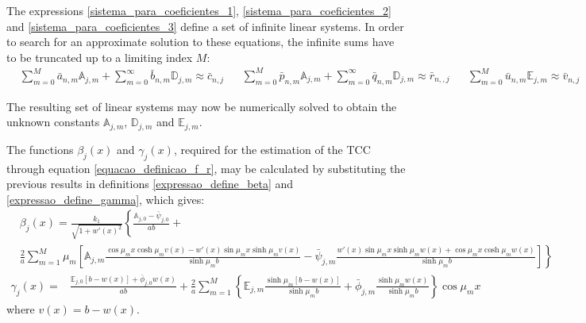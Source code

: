 \documentclass[12pt]{CHT-20}
\begin{document}
The expressions \eqref{sistema_para_coeficientes_1}, \eqref{sistema_para_coeficientes_2} and \eqref{sistema_para_coeficientes_3} define a set of infinite linear systems. In order to search for an approximate solution to these equations, the infinite sums have to be truncated up to a limiting index $M$:
\begin{subequations}
	\begin{align}
	& \sum_{m = 0}^M \bar{a}_{n,m} \mathbb{A}_{j,m} + \sum_{m = 0}^\infty \bar{b}_{n,m} \mathbb{D}_{j,m} \approx \bar{c}_{n,j} \label{sistema_para_coeficientes_1a}
	\end{align}
	\begin{align}
	& \sum_{m = 0}^M \bar{p}_{n,m} \mathbb{A}_{j,m} + \sum_{m = 0}^\infty \bar{q}_{n,m} \mathbb{D}_{j,m} \approx \bar{r}_{n,,j} \label{sistema_para_coeficientes_2a}
	\end{align}
	\begin{align}
	& \sum_{m = 0}^M \bar{u}_{n,m} \mathbb{E}_{j,m} \approx \bar{v}_{n,j} \label{sistema_para_coeficientes_3a}
	\end{align}
\end{subequations}

The resulting set of linear systems may now be numerically solved to obtain the unknown constants $\mathbb{A}_{j,m}$, $\mathbb{D}_{j,m}$ and $\mathbb{E}_{j,m}$.

The functions $\beta_j(x)$ and $\gamma_j(x)$, required for the estimation of the TCC through equation \eqref{equacao_definicao_f_r}, may be calculated by substituting the previous results in definitions \eqref{expressao_define_beta} and \eqref{expressao_define_gamma}, which gives:
\begin{align}
& \beta_j(x) = \frac{k_1}{\sqrt{1 + w'(x)^2}}\left\lbrace \frac{\mathbb{A}_{j,0} - \bar{\psi}_{j,0}}{ab} +
\right. \nonumber \\
& \frac{2}{a}\sum_{m=1}^M \mu_m  \left[ \mathbb{A}_{j,m}\frac{\scriptstyle\cos\mu_m x\cosh\mu_m v(x) - w'(x)\sin\mu_m x\sinh\mu_m v(x)}{\scriptstyle\sinh\mu_m b} \right. - 
\left. \left. \bar{\psi}_{j, m}\frac{\scriptstyle w'(x)\sin\mu_m x\sinh\mu_m w(x) + \cos\mu_m x\cosh\mu_m w(x)}{\scriptstyle\sinh\mu_m b}\right] \right\rbrace
\label{serie_para_beta}
\end{align}
\begin{align}
\gamma_j(x) = & \frac{\mathbb{E}_{j,0}[b - w(x)] + \bar{\phi}_{j,0}w(x)}{ab} +
\frac{2}{a}\sum_{m=1}^M \left\lbrace\mathbb{E}_{j,m}\frac{\sinh\mu_m [b - w(x)]}{\sinh\mu_m b} + 
\bar{\phi}_{j, m}\frac{\sinh\mu_m w(x)}{\sinh\mu_m b}\right\rbrace \cos\mu_m x
\label{serie_para_gamma}
\end{align} 
where $v(x) = b - w(x)$.
\end{document}
